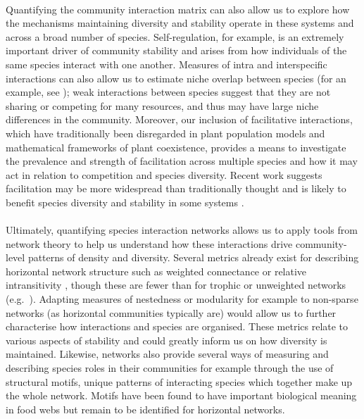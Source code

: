 \documentclass[a4,12pt]{article}
\begin{document}
\begin{refsection}
    \paragraph{}
    Quantifying the community interaction matrix can also allow us to explore how the mechanisms maintaining diversity and stability operate in these systems and across a broad number of species. Self-regulation, for example, is an extremely important driver of community stability \parencite{Barabas2017} and arises from how individuals of the same species interact with one another. Measures of intra and interspecific interactions can also allow us to estimate niche overlap between species (for an example, see \cite{Chu2015}); weak interactions between species suggest that they are not sharing or competing for many resources, and thus may have large niche differences in the community. Moreover, our inclusion of facilitative interactions, which have traditionally been disregarded in plant population models and mathematical frameworks of plant coexistence, provides a means to investigate the prevalence and strength of facilitation across multiple species and how it may act in relation to competition and species diversity. Recent work suggests facilitation may be more widespread than traditionally thought \parencite{Gross2015, Picoche2020} and is likely to benefit species diversity and stability in some systems \parencite{Coyte2015, Brooker2008}.

    \paragraph{}
    Ultimately, quantifying species interaction networks allows us to apply tools from network theory to help us understand how these interactions drive community-level patterns of density and diversity. Several metrics already exist for describing horizontal network structure such as weighted connectance \parencite{Ulanowicz1991} or relative intransitivity \parencite{Laird2006}, though these are fewer than for trophic or unweighted networks (e.g.\ \cite{Bersier2002, Delmas2019}). Adapting measures of nestedness or modularity for example to non-sparse networks (as horizontal communities typically are) would allow us to further characterise how interactions and species are organised. These metrics relate to various aspects of stability and could greatly inform us on how diversity is maintained. Likewise, networks also provide several ways of measuring and describing species roles in their communities \parencite{Cirtwill2018a} for example through the use of structural motifs, unique patterns of interacting species which together make up the whole network. Motifs have been found to have important biological meaning in food webs \parencite{Bascompte2005a} but remain to be identified for horizontal networks. 


\end{refsection}
\end{document}
